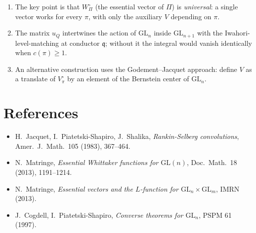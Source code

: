 \begin{enumerate}
\item The key point is that $W^\circ_\Pi$ (the essential vector of $\Pi$) is \emph{universal}: a single vector works for every $\pi$, with only the auxiliary $V$ depending on $\pi$.
\item The matrix $u_Q$ intertwines the action of $\mathrm{GL}_n$ inside $\mathrm{GL}_{n+1}$ with the Iwahori-level-matching at conductor $\mathfrak q$; without it the integral would vanish identically when $c(\pi)\geq 1$.
\item An alternative construction uses the Godement--Jacquet approach: define $V$ as a translate of $V^\circ_\pi$ by an element of the Bernstein center of $\mathrm{GL}_n$.
\end{enumerate}

\section*{References}
\begin{itemize}\setlength\itemsep{0.2em}
\item H.~Jacquet, I.~Piatetski-Shapiro, J.~Shalika, \emph{Rankin-Selberg convolutions}, Amer.\ J.\ Math.\ 105 (1983), 367--464.
\item N.~Matringe, \emph{Essential Whittaker functions for $\mathrm{GL}(n)$}, Doc.\ Math.\ 18 (2013), 1191--1214.
\item N.~Matringe, \emph{Essential vectors and the $L$-function for $\mathrm{GL}_n\times\mathrm{GL}_m$}, IMRN (2013).
\item J.~Cogdell, I.~Piatetski-Shapiro, \emph{Converse theorems for $\mathrm{GL}_n$}, PSPM 61 (1997).
\end{itemize}


